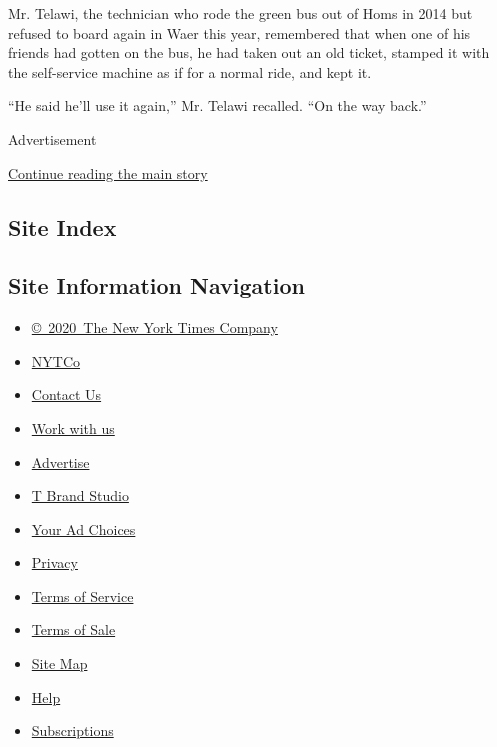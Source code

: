 Mr. Telawi, the technician who rode the green bus out of Homs in 2014
but refused to board again in Waer this year, remembered that when one
of his friends had gotten on the bus, he had taken out an old ticket,
stamped it with the self-service machine as if for a normal ride, and
kept it.

``He said he'll use it again,'' Mr. Telawi recalled. ``On the way
back.''

Advertisement

\protect\hyperlink{after-bottom}{Continue reading the main story}

\hypertarget{site-index}{%
\subsection{Site Index}\label{site-index}}

\hypertarget{site-information-navigation}{%
\subsection{Site Information
Navigation}\label{site-information-navigation}}

\begin{itemize}
\tightlist
\item
  \href{https://help.nytimes3xbfgragh.onion/hc/en-us/articles/115014792127-Copyright-notice}{©~2020~The
  New York Times Company}
\end{itemize}

\begin{itemize}
\tightlist
\item
  \href{https://www.nytco.com/}{NYTCo}
\item
  \href{https://help.nytimes3xbfgragh.onion/hc/en-us/articles/115015385887-Contact-Us}{Contact
  Us}
\item
  \href{https://www.nytco.com/careers/}{Work with us}
\item
  \href{https://nytmediakit.com/}{Advertise}
\item
  \href{http://www.tbrandstudio.com/}{T Brand Studio}
\item
  \href{https://www.nytimes3xbfgragh.onion/privacy/cookie-policy\#how-do-i-manage-trackers}{Your
  Ad Choices}
\item
  \href{https://www.nytimes3xbfgragh.onion/privacy}{Privacy}
\item
  \href{https://help.nytimes3xbfgragh.onion/hc/en-us/articles/115014893428-Terms-of-service}{Terms
  of Service}
\item
  \href{https://help.nytimes3xbfgragh.onion/hc/en-us/articles/115014893968-Terms-of-sale}{Terms
  of Sale}
\item
  \href{https://spiderbites.nytimes3xbfgragh.onion}{Site Map}
\item
  \href{https://help.nytimes3xbfgragh.onion/hc/en-us}{Help}
\item
  \href{https://www.nytimes3xbfgragh.onion/subscription?campaignId=37WXW}{Subscriptions}
\end{itemize}
